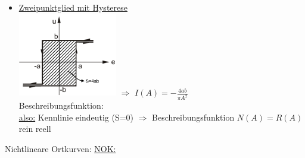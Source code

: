 \documentclass[openany,a4paper,11pt]{book}
\begin{document}
\begin{itemize}
     (A$\ge$0)\\
    \uline{weitere Beschreibungsfunktionen:}  \\
    \uline{Komplexer Anteil $I(A)$ von $N(A)$:} tritt auf bei Hysteresekennlinien, leicht nachzurechnen:\\
     mit S=\uline{Flächeninhalt der Hystereseschleife}
    \item \uline{Zweipunktglied mit Hysterese}\\
    \includegraphics[width=1.7in]{imgs/NLR51.png} $\Rightarrow$ $I(A)=-\frac{4ab}{\pi A^2}$\\
    Beschreibungsfunktion: \\
    \uline{also:} Kennlinie eindeutig (S=0) $\Rightarrow$ Beschreibungsfunktion $N(A)=R(A)$ rein reell
\end{itemize}
Nichtlineare Ortkurven: \uline{NOK:} 
\end{document}
